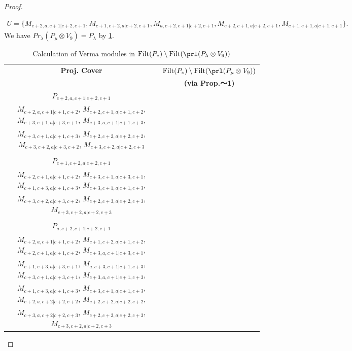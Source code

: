 \begin{proof}
\begin{enumerate}
\begin{enumerate}
\begin{equation}
\begin{aligned}
    U = \{
M_{c+2,a,c+1|c+2,c+1},
M_{c+1,c+2,a|c+2,c+1},
M_{a,c+2,c+1|c+2,c+1},
M_{c+2,c+1,a|c+2,c+1},
M_{c+1,c+1,a|c+1,c+1}
\}.
  \end{aligned}
\end{equation}
       We have $Pr_{\lambda}(P_\mu \otimes V_{9}) = P_\lambda  $ by \cref{tab:verma-analysis_24}.
\begin{table}[htbp]
\centering
\caption{Calculation of Verma modules in $\operatorname{Filt}(P_*) \setminus \operatorname{Filt}(\prl(P_\lambda \otimes V_{9})) $ } \label{tab:verma-analysis_24}
\begin{tabular}{cc}
\toprule
\textbf{Proj. Cover} & \textbf{$\operatorname{Filt}(P_*) \setminus \operatorname{Filt}(\prl(P_\mu \otimes V_{9})) $}  \\
     & \textbf{(via Prop.～1)}  \\
\midrule
 $P_{c+2,a,c+1|c+2,c+1}$ & \makecell{
 $M_{c+3,a,c+1|c+3,c+1}$,
 $M_{c+2,a,c+2|c+2,c+2}$,
 $M_{c+3,a,c+2|c+3,c+2}$,
 $M_{c+3,a,c+2|c+2,c+3}$, \\
 $M_{c+2,a,c+1|c+1,c+2}$,
 $M_{c+2,c+1,a|c+1,c+2}$,
 $M_{c+3,c+1,a|c+3,c+1}$,
 $M_{c+3,a,c+1|c+1,c+3}$, \\
 $M_{c+3,c+1,a|c+1,c+3}$,
 $M_{c+2,c+2,a|c+2,c+2}$,
 $M_{c+3,c+2,a|c+3,c+2}$,
 $M_{c+3,c+2,a|c+2,c+3}$
}\\
 & \\
 $P_{c+1,c+2,a|c+2,c+1}$ & \makecell{
 $M_{c+2,c+2,a|c+2,c+2}$,
 $M_{c+1,c+3,a|c+3,c+1}$,
 $M_{c+2,c+3,a|c+3,c+2}$,
 $M_{c+1,c+2,a|c+1,c+2}$, \\
 $M_{c+2,c+1,a|c+1,c+2}$,
 $M_{c+3,c+1,a|c+3,c+1}$,
 $M_{c+1,c+3,a|c+1,c+3}$,
 $M_{c+3,c+1,a|c+1,c+3}$, \\
 $M_{c+3,c+2,a|c+3,c+2}$,
 $M_{c+2,c+3,a|c+2,c+3}$,
 $M_{c+3,c+2,a|c+2,c+3}$
}\\
 & \\
 $P_{a,c+2,c+1|c+2,c+1}$ & \makecell{
 $M_{a,c+3,c+1|c+3,c+1}$,
 $M_{a,c+2,c+2|c+2,c+2}$,
 $M_{a,c+3,c+2|c+2,c+3}$,
 $M_{a,c+2,c+1|c+1,c+2}$, \\
 $M_{c+2,a,c+1|c+1,c+2}$,
 $M_{c+1,c+2,a|c+1,c+2}$,
 $M_{c+2,c+1,a|c+1,c+2}$,
 $M_{c+3,a,c+1|c+3,c+1}$, \\
 $M_{c+1,c+3,a|c+3,c+1}$,
 $M_{a,c+3,c+1|c+1,c+3}$,
 $M_{c+3,c+1,a|c+3,c+1}$,
 $M_{c+3,a,c+1|c+1,c+3}$, \\
 $M_{c+1,c+3,a|c+1,c+3}$,
 $M_{c+3,c+1,a|c+1,c+3}$,
 $M_{c+2,a,c+2|c+2,c+2}$,
 $M_{c+2,c+2,a|c+2,c+2}$, \\
 $M_{c+3,a,c+2|c+2,c+3}$,
 $M_{c+2,c+3,a|c+2,c+3}$,
 $M_{c+3,c+2,a|c+2,c+3}$
}
\end{tabular}
\end{table}
\end{enumerate}
\end{enumerate}
\end{proof}

